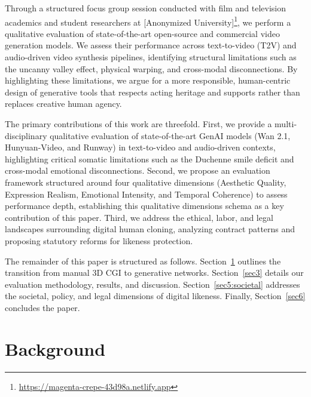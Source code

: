 \documentclass[pdflatex,sn-mathphys-num]{sn-jnl}
\theoremstyle{thmstyleone}
\theoremstyle{thmstyletwo}
\theoremstyle{thmstylethree}
\begin{document}
Through a structured focus group session conducted with film and television academics and student researchers at [Anonymized University]\footnote{\url{https://magenta-crepe-43d98a.netlify.app}}, we perform a qualitative evaluation of state-of-the-art open-source and commercial video generation models. We assess their performance across text-to-video (T2V) and audio-driven video synthesis pipelines, identifying structural limitations such as the uncanny valley effect, physical warping, and cross-modal disconnections. By highlighting these limitations, we argue for a more responsible, human-centric design of generative tools that respects acting heritage and supports rather than replaces creative human agency.

The primary contributions of this work are threefold. First, we provide a multi-disciplinary qualitative evaluation of state-of-the-art GenAI models (Wan 2.1, Hunyuan-Video, and Runway) in text-to-video and audio-driven contexts, highlighting critical somatic limitations such as the Duchenne smile deficit and cross-modal emotional disconnections. Second, we propose an evaluation framework structured around four qualitative dimensions (Aesthetic Quality, Expression Realism, Emotional Intensity, and Temporal Coherence) to assess performance depth, establishing this qualitative dimensions schema as a key contribution of this paper. Third, we address the ethical, labor, and legal landscapes surrounding digital human cloning, analyzing contract patterns and proposing statutory reforms for likeness protection.

The remainder of this paper is structured as follows. Section~\ref{sec:background} outlines the transition from manual 3D CGI to generative networks. Section~\ref{sec3} details our evaluation methodology, results, and discussion. Section~\ref{sec5:societal} addresses the societal, policy, and legal dimensions of digital likeness. Finally, Section~\ref{sec6} concludes the paper.

\section{Background}\label{sec:background}
\end{document}
